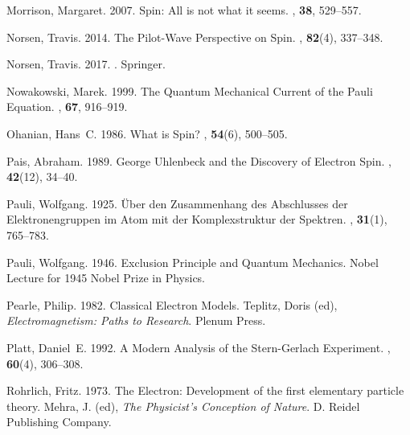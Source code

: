 \documentclass[12pt,secnumarabic,amsmath,amssymb,balancelastpage,nofootinbib]{article}
\begin{document}
\begin{thebibliography}{}
Morrison, Margaret. 2007.
\newblock Spin: All is not what it seems.
, {\bf 38},
  529--557.

Norsen, Travis. 2014.
\newblock The Pilot-Wave Perspective on Spin.
, {\bf 82}(4), 337--348.

Norsen, Travis. 2017.
.
\newblock Springer.

Nowakowski, Marek. 1999.
\newblock The Quantum Mechanical Current of the Pauli Equation.
, {\bf 67}, 916--919.

Ohanian, Hans~C. 1986.
\newblock What is Spin?
, {\bf 54}(6), 500--505.

Pais, Abraham. 1989.
\newblock George Uhlenbeck and the Discovery of Electron Spin.
, {\bf 42}(12), 34--40.

Pauli, Wolfgang. 1925.
\newblock \"{U}ber den Zusammenhang des Abschlusses der Elektronengruppen im
  Atom mit der Komplexstruktur der Spektren.
, {\bf 31}(1), 765--783.

Pauli, Wolfgang. 1946.
\newblock Exclusion Principle and Quantum Mechanics.
\newblock Nobel Lecture for 1945 Nobel Prize in Physics.

Pearle, Philip. 1982.
\newblock Classical Electron Models.
 Teplitz, Doris (ed), {\em Electromagnetism:
  Paths to Research}.
\newblock Plenum Press.

Platt, Daniel~E. 1992.
\newblock A Modern Analysis of the Stern-Gerlach Experiment.
, {\bf 60}(4), 306--308.

Rohrlich, Fritz. 1973.
\newblock The Electron: Development of the first elementary particle theory.
 Mehra, J. (ed), {\em The Physicist's
  Conception of Nature}.
\newblock D. Reidel Publishing Company.


\end{thebibliography}
\end{document}
